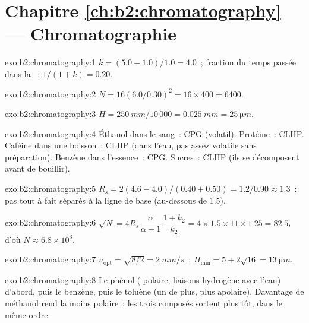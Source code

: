 \section*{Chapitre \ref{ch:b2:chromatography} --- Chromatographie}

\begin{solution}{exo:b2:chromatography:1}
$k = (5.0 - 1.0)/1.0 = 4.0$~; fraction du temps passée dans la ~: $1/(1 + k) = 0.20$.
\end{solution}

\begin{solution}{exo:b2:chromatography:2}
$N = 16(6.0/0.30)^2 = 16 \times 400 = 6400$.
\end{solution}

\begin{solution}{exo:b2:chromatography:3}
$H = \qty{250}{mm}/10\,000 = \qty{0.025}{mm} = \qty{25}{\micro m}$.
\end{solution}

\begin{solution}{exo:b2:chromatography:4}
Éthanol dans le sang~: CPG (volatil). Protéine~: CLHP. Caféine dans une boisson~: CLHP (dans l'eau, pas
assez volatile sans préparation). Benzène dans l'essence~: CPG. Sucres~: CLHP (ils se décomposent avant
de bouillir).
\end{solution}

\begin{solution}{exo:b2:chromatography:5}
$R_s = 2(4.6 - 4.0)/(0.40 + 0.50) = 1.2/0.90 \approx 1.3$~: pas tout à fait séparés à la ligne de base (au-dessous de 1.5).
\end{solution}

\begin{solution}{exo:b2:chromatography:6}
$\sqrt N = 4R_s\,\dfrac{\alpha}{\alpha - 1}\,\dfrac{1 + k_2}{k_2} = 4 \times 1.5 \times 11 \times 1.25 =
82.5$, d'où $N \approx 6.8 \times 10^3$.
\end{solution}

\begin{solution}{exo:b2:chromatography:7}
$u_{\mathrm{opt}} = \sqrt{8/2} = \qty{2}{mm/s}$~; $H_{\min} = 5 + 2\sqrt{16} = \qty{13}{\micro m}$.
\end{solution}

\begin{solution}{exo:b2:chromatography:8}
Le phénol ( polaire, liaisons hydrogène avec l'eau) d'abord, puis le benzène, puis le toluène (un
 de plus, plus apolaire). Davantage de méthanol rend la  moins polaire~: les trois
composés sortent plus tôt, dans le même ordre.
\end{solution}

